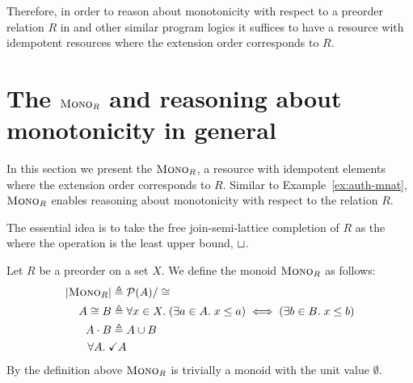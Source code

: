 \documentclass{scrartcl}
\begin{document}
Therefore, in order to reason about monotonicity with respect to a
preorder relation $R$ in \Iris{} and other similar program logics it
suffices to have a resource with idempotent resources where the
extension order corresponds to $R$.

\section{The $\textsc{Mono}_{R}$ \PCM{} and reasoning about monotonicity in
  general}
In this section we present the \PCM{} $\textsc{Mono}_{R}$, a resource with
idempotent elements where the extension order corresponds to
$R$. Similar to Example~\ref{ex:auth-mnat}, $\textsc{Mono}_{R}$ enables
reasoning about monotonicity with respect to the relation $R$.

The essential idea is to take the free join-semi-lattice completion of
$R$ as the \PCM{} where the operation is the least upper bound,
$\sqcup$.

\begin{definition}
  Let $R$ be a preorder on a set $X$. We define the monoid $\textsc{Mono}_{R}$
  as follows:
\begin{align*}
  |\textsc{Mono}_{R}| \triangleq{}& \mathcal{P}(A)/\cong\\
  A \cong B \triangleq{}& \forall x \in X.\; (\exists a \in A.\; x \le a) \iff (\exists b \in B.\; x \le b)\\
  A \cdot B \triangleq{} & A \cup B\\
  \forall A.\; \checkmark{A}
\end{align*}
By the definition above $\textsc{Mono}_{R}$ is trivially a monoid with the
unit value $\emptyset$.
\end{definition}
\end{document}
